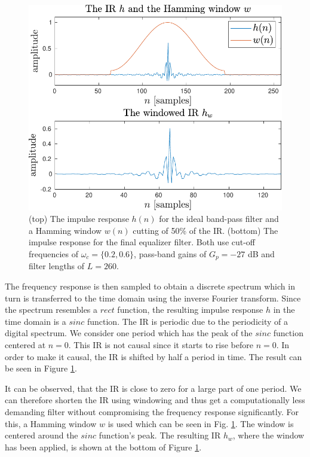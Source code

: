 \documentclass[journal]{IEEEtran}
\begin{document}
\begin{figure}
    \centering
    \includegraphics[width=\columnwidth]{assignment_02/plots/equalizer_ir.pdf}
    \caption{(top) The impulse response $h(n)$ for the ideal band-pass filter and a Hamming window $w(n)$ cutting of 50\% of the IR. (bottom) The impulse response for the final equalizer filter. Both use cut-off frequencies of $\omega_c=\{0.2,0.6\}$, pass-band gains of $G_p=-27$ dB and filter lengths of $L=260$.}
    \label{fig:eq_ir}
\end{figure}

The frequency response is then sampled to obtain a discrete spectrum which in turn is transferred to the time domain using the inverse Fourier transform. Since the spectrum resembles a $rect$ function, the resulting impulse response $h$ in the time domain is a $sinc$ function. The IR is periodic due to the periodicity of a digital spectrum. We consider one period which has the peak of the $sinc$ function centered at $n=0$. This IR is not causal since it starts to rise before $n=0$. In order to make it causal, the IR is shifted by half a period in time. The result can be seen in Figure \ref{fig:eq_ir}. 

It can be observed, that the IR is close to zero for a large part of one period. We can therefore shorten the IR using windowing and thus get a computationally less demanding filter without compromising the frequency response significantly. For this, a Hamming window $w$ is used which can be seen in Fig. \ref{fig:eq_ir}. The window is centered around the $sinc$ function's peak. The resulting IR $h_w$, where the window has been applied, is shown at the bottom of Figure \ref{fig:eq_ir}.
\end{document}

